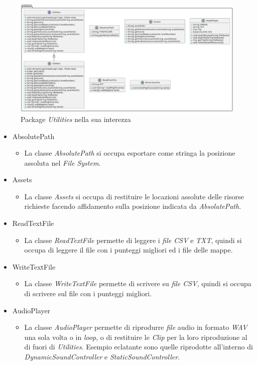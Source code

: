\documentclass[12pt,a4paper]{report}
\begin{document}
\begin{figure}[H]
	\centering
	\includegraphics[width=1\textwidth]{Utilities.pdf}
	\caption{Package \emph{Utilities} nella sua interezza}
	\label{fig:Utilities}
\end{figure}

\begin{itemize}
	\item AbsolutePath
	\begin{itemize}
		\item La classe \emph{AbsolutePath} si occupa esportare come stringa la posizione assoluta nel \emph{File System}.
	\end{itemize}
	\item Assets
	\begin{itemize}
		\item La classe \emph{Assets} si occupa di restituire le locazioni assolute delle risorse richieste facendo affidamento sulla posizione indicata da \emph{AbsolutePath}.
	\end{itemize}
	\item ReadTextFile
	\begin{itemize}
		\item La classe \emph{ReadTextFile} permette di leggere i \emph{file CSV} e \emph{TXT}, quindi si occupa di leggere il file con i punteggi migliori ed i file delle mappe.
	\end{itemize}
	\item WriteTextFile
	\begin{itemize}
		\item La classe \emph{WriteTextFile} permette di scrivere su \emph{file CSV}, quindi si occupa di scrivere sul file con i punteggi migliori.
	\end{itemize}
	\item AudioPlayer
	\begin{itemize}
		\item La classe \emph{AudioPlayer} permette di riprodurre \emph{file} audio in formato \emph{WAV} una sola volta o in \emph{loop}, o di restituire le \emph{Clip} per la loro riproduzione al di fuori di \emph{Utilities}. Esempio eclatante sono quelle riprodotte all'interno di \emph{DynamicSoundController} e \emph{StaticSoundController}.
	\end{itemize}
\end{itemize}
\end{document}
